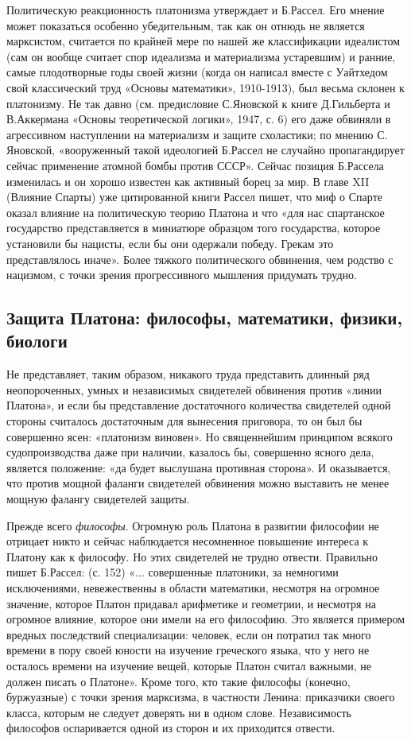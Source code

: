 Политическую реакционность платонизма утверждает и Б.Рассел. Его
мнение может показаться особенно убедительным, так как он отнюдь не
является марксистом, считается по крайней мере по нашей же
классификации идеалистом (сам он вообще считает спор идеализма и
материализма устаревшим) и ранние, самые плодотворные годы своей жизни
(когда он написал вместе с Уайтхедом свой классический труд «Основы
математики», 1910-1913), был весьма склонен к платонизму. Не так давно
(см. предисловие С.Яновской к книге Д.Гильберта и В.Аккермана «Основы
теоретической логики», 1947, с. 6) его даже обвиняли в агрессивном
наступлении на материализм и защите схоластики; по мнению С. Яновской,
«вооруженный такой идеологией Б.Рассел не случайно пропагандирует
сейчас применение атомной бомбы против СССР». Сейчас позиция Б.Рассела
изменилась и он хорошо известен как активный борец за мир. В главе XII
(Влияние Спарты) уже цитированной книги Рассел пишет, что миф о Спарте
оказал влияние на политическую теорию Платона и что «для нас
спартанское государство представляется в миниатюре образцом того
государства, которое установили бы нацисты, если бы они одержали
победу. Грекам это представлялось иначе». Более тяжкого политического
обвинения, чем родство с нацизмом, с точки зрения прогрессивного
мышления придумать трудно.

\subsection{Защита Платона: философы, математики, физики, биологи}

Не представляет, таким образом, никакого труда представить длинный ряд
неопороченных, умных и независимых свидетелей обвинения против «линии
Платона», и если бы представление достаточного количества свидетелей
одной стороны считалось достаточным для вынесения приговора, то он был
бы совершенно ясен: «платонизм виновен». Но священнейшим принципом
всякого судопроизводства даже при наличии, казалось бы, совершенно
ясного дела, является положение: «да будет выслушана противная
сторона». И оказывается, что против мощной фаланги свидетелей
обвинения можно выставить не менее мощную фалангу свидетелей защиты.

Прежде всего \textit{философы}. Огромную роль Платона в развитии
философии не отрицает никто и сейчас наблюдается несомненное повышение
интереса к Платону как к философу. Но этих свидетелей не трудно
отвести. Правильно пишет Б.Рассел: (с. 152) «... совершенные
платоники, за немногими исключениями, невежественны в области
математики, несмотря на огромное значение, которое Платон придавал
арифметике и геометрии, и несмотря на огромное влияние, которое они
имели на его философию. Это является примером вредных последствий
специализации: человек, если он потратил так много времени в пору
своей юности на изучение греческого языка, что у него не осталось
времени на изучение вещей, которые Платон считал важными, не должен
писать о Платоне». Кроме того, кто такие философы (конечно,
буржуазные) с точки зрения марксизма, в частности Ленина: приказчики
своего класса, которым не следует доверять ни в одном слове.
Независимость философов оспаривается одной из сторон и их приходится
отвести.

